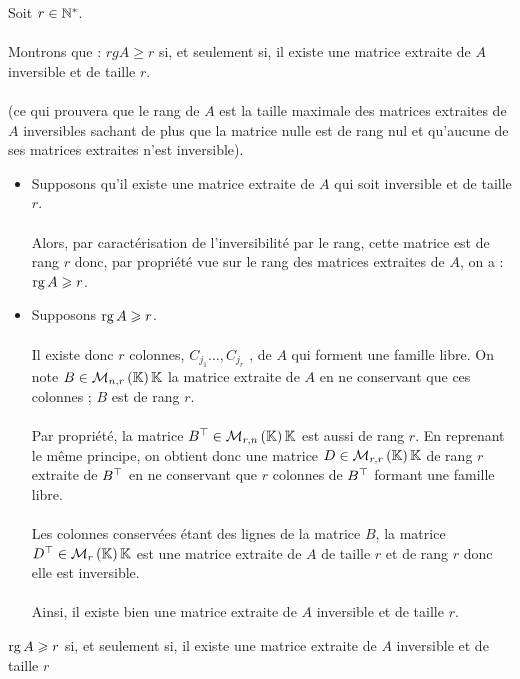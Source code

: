 \begin{dem}
    Soit \(r \in \mathbb{N}^*\).\\~\\
    Montrons que : \(rg A \geq r\) si, et seulement si, il existe une matrice extraite de \(A\) inversible et de taille \(r\).\\~\\
    (ce qui prouvera que le rang de \(A\) est la taille maximale des matrices extraites de \(A\) inversibles sachant de plus que la matrice nulle est de rang nul et qu’aucune de ses matrices extraites n’est inversible).
    \begin{itemize}
        \item Supposons qu’il existe une matrice extraite de \(A\) qui soit inversible et de taille \(r\).\\~\\
        Alors, par caractérisation de l’inversibilité par le rang, cette matrice est de rang \(r\) donc, par propriété vue sur le rang des matrices extraites de \(A\), on a : \( \operatorname{rg} A \geqslant r\).
        \item Supposons \(\operatorname{rg} A \geqslant r\).\\~\\
        Il existe donc \(r\) colonnes, \(C_{j_1} \dots , C_{j_r}\) , de \(A\) qui forment une famille libre. On note \(B \in \M{n,r}{\K}\) la matrice extraite de \(A\) en ne conservant que ces colonnes ; \(B\) est de rang \(r\).\\~\\
        Par propriété, la matrice \(\trans{B} \in \M{r,n}{\K}\) est aussi de rang \(r\). En reprenant le même principe, on obtient donc une matrice \(D \in \M{r,r}{\K}\) de rang \(r\) extraite de \(B^{\top}\) en ne conservant que \(r\) colonnes de \(B^{\top}\) formant une famille libre.\\~\\
        Les colonnes conservées étant des lignes de la matrice \(B\), la matrice \(\trans{D} \in \M{r}{\K}\) est une matrice extraite de \(A\) de taille \(r\) et de rang \(r\) donc elle est inversible.\\~\\
        Ainsi, il existe bien une matrice extraite de \(A\) inversible et de taille \(r\).
    \end{itemize}
    \conclusion \(\operatorname{rg} A \geqslant r\) si, et seulement si, il existe une matrice extraite de \(A\) inversible et de taille \(r\)
\end{dem}
